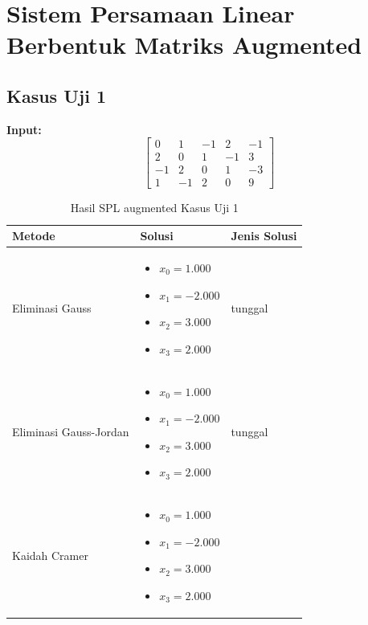 \documentclass[12pt,a4paper]{report}
\begin{document}
\section{Sistem Persamaan Linear Berbentuk Matriks Augmented}
 
\subsection{Kasus Uji 1}
\textbf{Input:}
\[
\left[\begin{array}{cccc|c}
     0 &1 &-1 &2 &-1 \\
    2 &0 &1 &-1 &3 \\
    -1 &2 &0 &1 &-3 \\
    1 &-1 &2& 0 &9
\end{array}\right]
\]


\begin{table}[H]
    \centering
    \caption{Hasil SPL augmented Kasus Uji 1}
    \begin{tabular}{|l|p{5cm}|l|}
        \hline
        \textbf{Metode} & \textbf{Solusi} & \textbf{Jenis Solusi} \\
        \hline
        Eliminasi Gauss & 
        \begin{itemize}
            \item $x_0 = 1.000$
            \item $x_1 = -2.000$
            \item $x_2 = 3.000$
            \item $x_3 = 2.000$
        \end{itemize}
        & tunggal \\
        \hline
        Eliminasi Gauss-Jordan & 
        \begin{itemize}
            \item $x_0 = 1.000$
            \item $x_1 = -2.000$
            \item $x_2 = 3.000$
            \item $x_3 = 2.000$
        \end{itemize}
        & tunggal \\
        \hline
        Kaidah Cramer & 
        \begin{itemize}
            \item $x_0 = 1.000$
            \item $x_1 = -2.000$
            \item $x_2 = 3.000$
            \item $x_3 = 2.000$

\end{itemize}
\end{tabular}
\end{table}
\end{document}
